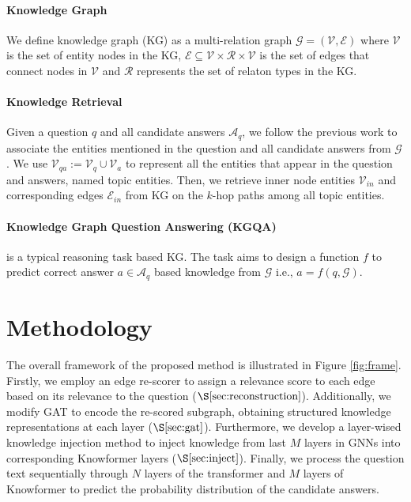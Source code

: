 \documentclass[11pt]{article}
\begin{document}
\paragraph{Knowledge Graph}
We define knowledge graph (KG) as a multi-relation graph $\mathcal{G}=(\mathcal{V},\mathcal{E})$ where $\mathcal{V}$ is the set of entity nodes in the KG, $\mathcal{E} \subseteq \mathcal{V} \times \mathcal{R} \times \mathcal{V}$ is the set of edges that connect nodes in $\mathcal{V}$ and $\mathcal{R}$ represents the set of relaton types in the KG. 

\paragraph{Knowledge Retrieval}
Given a question $q$ and all candidate answers $\mathcal{A}_q$, we follow the previous work \cite{kagnet} to associate the entities mentioned in the question and all candidate answers from $\mathcal{G}$. We use $\mathcal{V}_{qa}:= \mathcal{V}_q \cup \mathcal{V}_a$ to represent all the entities that appear in the question and answers, named topic entities. Then, we retrieve inner node entities $\mathcal{V}_{in}$ and corresponding edges $\mathcal{E}_{in}$ from KG on the $k$-hop paths among all topic entities. 

\paragraph{Knowledge Graph Question Answering (KGQA)} is a typical reasoning task based KG. The task aims to design a function $f$ to predict correct answer $a \in \mathcal{A}_q$ based knowledge from $\mathcal{G}$ i.e., $a=f(q,\mathcal{G})$. 



\section{Methodology}


The overall framework of the proposed method is illustrated in Figure \ref{fig:frame}. 
Firstly, we employ an edge re-scorer to assign a relevance score to each edge based on its relevance to the question ($\S \ref{sec:reconstruction}$).
Additionally, we modify GAT to encode the re-scored subgraph, obtaining structured knowledge representations at each layer ($\S \ref{sec:gat}$). Furthermore, we develop a layer-wised knowledge injection method to inject knowledge from last $M$ layers in GNNs into corresponding Knowformer layers ($\S \ref{sec:inject}$). 
Finally, we process the question text sequentially through $N$ layers of the transformer and $M$ layers of Knowformer to predict the probability distribution of the candidate answers.
\end{document}
